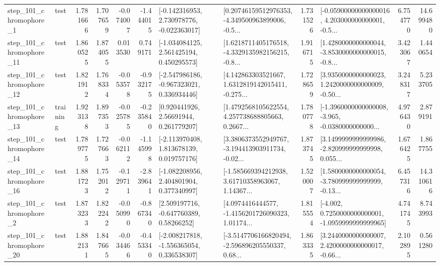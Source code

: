 \begin{tabular}{llrrrrllrlrr}
   step\_101\_chromophore\_1 &      test &      1.781666 &    1.707659 &     -0.074007 & -1.444015 &   [-0.142316953, 2.730978776, -0.022363017] &  [0.20746159512976353, -4.349500963899006, -0.5... &       1.731526 &  [-0.05900000000000016, 4.203000000000001, -0.5... &            6.754770 &         14.699480 \\
  step\_101\_chromophore\_11 &      test &      1.860525 &    1.874055 &      0.013530 &  0.749171 &    [-1.034084125, 2.561425194, 0.450295573] &  [1.6218711405176518, -4.3329135982156215, -0.8... &       1.916715 &  [1.4280000000000044, -3.8530000000000015, -0.8... &            3.423067 &          1.440654 \\
  step\_101\_chromophore\_12 &      test &      1.821912 &    1.768334 &     -0.053578 & -0.932175 &   [-2.547986186, -0.967323021, 0.336934446] &  [4.142863303521667, 1.6312819142015411, -0.275... &       1.728659 &  [3.9350000000000023, 1.2420000000000009, -0.50... &            3.248317 &          5.233705 \\
  step\_101\_chromophore\_13 &  training &      1.923138 &    1.897353 &     -0.025785 & -0.235840 &      [0.920441926, 2.56691944, 0.261779207] &  [1.4792568105622554, 4.257738688805663, 0.2667... &       1.780778 &  [-1.3960000000000008, -3.965, -0.0380000000000... &            4.976430 &          2.879191 \\
  step\_101\_chromophore\_14 &      test &      1.789775 &    1.727663 &     -0.062112 & -1.145998 &    [-2.113970408, 1.813678139, 0.019757176] &  [3.3806373552949767, -3.194413903911734, -0.02... &       1.873745 &  [3.1499999999999986, -2.820999999999998, 0.055... &            1.676425 &          1.867755 \\
  step\_101\_chromophore\_16 &      test &      1.881723 &    1.752012 &     -0.129711 & -2.839641 &    [-1.082208956, 2.404801904, 0.377340997] &  [-1.585669394212938, 3.61710358963067, 1.14367... &       1.520007 &  [1.5800000000000054, -3.780999999999999, -0.13... &            6.457316 &         14.310616 \\
   step\_101\_chromophore\_2 &      test &      1.873233 &    1.822242 &     -0.050990 & -0.867340 &     [2.509197716, -0.647760389, 0.58266252] &  [4.0974416444577, -1.4156201726090323, 1.01174... &       1.815554 &  [-4.002, 0.7250000000000001, -1.0959999999999965] &            4.741745 &          8.743993 \\
  step\_101\_chromophore\_20 &      test &      1.882131 &    1.847665 &     -0.034466 & -0.453340 &   [-2.008217818, -1.556365054, 0.336538307] &  [-3.5147706166820494, -2.596896205550337, 0.68... &       1.863335 &  [3.2440000000000007, 2.4200000000000017, -0.66... &            2.102895 &          0.561280 \\

\end{tabular}
